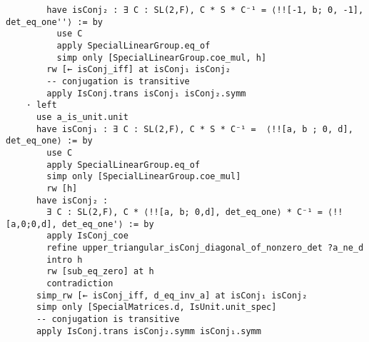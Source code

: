 \begin{footnotesize}
\begin{verbatim}
        have isConj₂ : ∃ C : SL(2,F), C * S * C⁻¹ = ⟨!![-1, b; 0, -1], det_eq_one''⟩ := by
          use C
          apply SpecialLinearGroup.eq_of
          simp only [SpecialLinearGroup.coe_mul, h]
        rw [← isConj_iff] at isConj₁ isConj₂
        -- conjugation is transitive
        apply IsConj.trans isConj₁ isConj₂.symm
    · left
      use a_is_unit.unit
      have isConj₁ : ∃ C : SL(2,F), C * S * C⁻¹ =  ⟨!![a, b ; 0, d], det_eq_one⟩ := by
        use C
        apply SpecialLinearGroup.eq_of
        simp only [SpecialLinearGroup.coe_mul]
        rw [h]
      have isConj₂ :
        ∃ C : SL(2,F), C * ⟨!![a, b; 0,d], det_eq_one⟩ * C⁻¹ = ⟨!![a,0;0,d], det_eq_one'⟩ := by
        apply IsConj_coe
        refine upper_triangular_isConj_diagonal_of_nonzero_det ?a_ne_d
        intro h
        rw [sub_eq_zero] at h
        contradiction
      simp_rw [← isConj_iff, d_eq_inv_a] at isConj₁ isConj₂
      simp only [SpecialMatrices.d, IsUnit.unit_spec]
      -- conjugation is transitive
      apply IsConj.trans isConj₂.symm isConj₁.symm
\end{verbatim}
\end{footnotesize}

